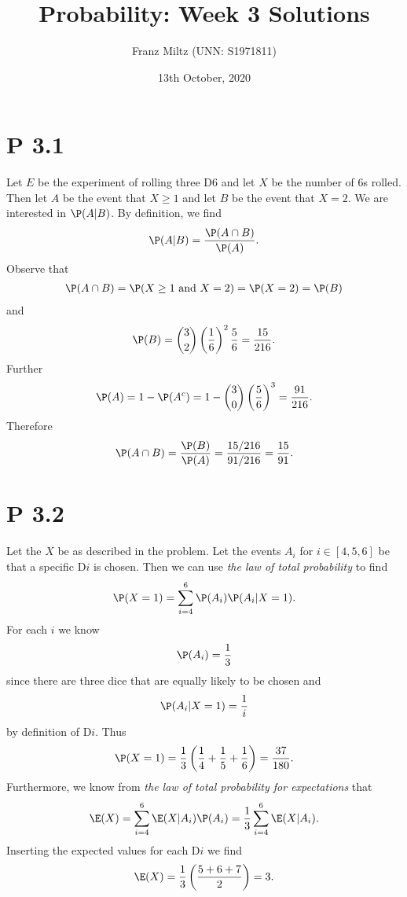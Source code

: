 \documentclass{article}
\begin{document}
\title{Probability: Week 3 Solutions}
\author{Franz Miltz (UNN: S1971811)}
\date{13th October, 2020}
\maketitle


\section*{P 3.1}


Let $E$ be the experiment of rolling three D6 and let $X$ be the number of 6s rolled.
Then let $A$ be the event that $X\geq 1$ and let $B$ be the event that $X=2$. 
We are interested in $\P(A|B)$. By definition, we find
\begin{align*}
  \P(A|B) = \frac{\P(A\cap B)}{\P(A)}.
\end{align*}
Observe that 
\begin{align*}
  \P(A\cap B) = \P(X\geq 1 \text{ and } X = 2) = \P(X=2) = \P(B)
\end{align*}
and
\begin{align*}
  \P(B) = \binom{3}{2}\left(\frac{1}{6}\right)^2\frac{5}{6}=\frac{15}{216}.
\end{align*}
Further
\begin{align*}
  \P(A) = 1-\P(A^c) = 1-\binom{3}{0}\left(\frac{5}{6}\right)^3=\frac{91}{216}.
\end{align*}
Therefore
\begin{align*}
  \P(A\cap B) = \frac{\P(B)}{\P(A)}= \frac{15/216}{91/216} = \frac{15}{91}.
\end{align*}


\section*{P 3.2}


Let the $X$ be as described in the problem. Let the events
$A_i$ for $i\in[4,5,6]$ be that a specific D$i$ is chosen.
Then we can use \emph{the law of total probability} to find
\begin{align*}
  \P(X=1)=\sum_{i=4}^6\P(A_i)\P(A_i|X=1).
\end{align*}
For each $i$ we know
\begin{align*}
  \P(A_i) = \frac{1}{3} 
\end{align*}
since there are three dice that are equally likely to be chosen and
\begin{align*}
  \P(A_i|X=1) = \frac{1}{i}
\end{align*}
by definition of D$i$.
Thus 
\begin{align*}
  \P(X=1) = \frac{1}{3}\left(\frac{1}{4}+\frac{1}{5}+\frac{1}{6}\right)=\frac{37}{180}.
\end{align*}
Furthermore, we know from \emph{the law of total probability for expectations} that
\begin{align*}
  \E(X) = \sum_{i=4}^6 \E(X|A_i)\P(A_i) = \frac{1}{3}\sum_{i=4}^6\E(X|A_i).
\end{align*}
Inserting the expected values for each D$i$ we find
\begin{align*}
  \E(X) = \frac{1}{3}\left(\frac{5 + 6 + 7}{2}\right)=3.
\end{align*}
\end{document}
